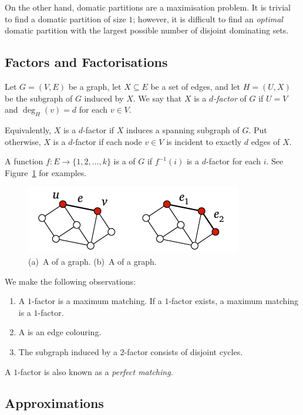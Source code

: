 On the other hand, domatic partitions are a maximisation problem. It is trivial to find a domatic partition of size $1$; however, it is difficult to find an \emph{optimal} domatic partition with the largest possible number of disjoint dominating sets.


\subsection{Factors and Factorisations}

Let $G = (V,E)$ be a graph, let $X \subseteq E$ be a set of edges, and let $H = (U,X)$ be the subgraph of $G$ induced by $X$. We say that $X$ is a \emph{$d$-factor} of $G$ if $U = V$ and $\deg_H(v) = d$ for each $v \in V$.

Equivalently, $X$ is a $d$-factor if $X$ induces a spanning  subgraph of $G$. Put otherwise, $X$ is a $d$-factor if each node $v \in V$ is incident to exactly $d$ edges of $X$.

A function $f\colon E \to \{1,2,\dotsc,k\}$ is a \emph{} of $G$ if $f^{-1}(i)$ is a $d$-factor for each $i$. See Figure~\ref{fig:factorisation} for examples.
\begin{figure}
    \centering
    \includegraphics[page=\PFactorisation]{figs.pdf}
    \caption{
        (a)~A  of a  graph.
        (b)~A  of a  graph.
    }\label{fig:factorisation}
\end{figure}

We make the following observations:
\begin{enumerate}
    \item A $1$-factor is a maximum matching. If a $1$-factor exists, a maximum matching is a $1$-factor.
    \item A  is an edge colouring.
    \item The subgraph induced by a $2$-factor consists of disjoint cycles.
\end{enumerate}
A $1$-factor is also known as a \emph{perfect matching}.


\subsection{Approximations}

